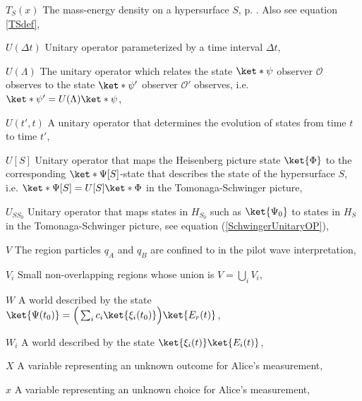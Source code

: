 \begin{thenomenclature}
      \item [{$T_S(x)$  }]\begingroup The mass-energy density on a hypersurface $S$, p. \pageref{firstTS}. Also see equation \ref{TSdef}, \nomrefpage {}
      \item [{$U(\Delta t)$}]\begingroup Unitary operator parameterized by a time interval $\Delta t$, \nomrefpage{}
      \item [{$U(\Lambda)$}]\begingroup The unitary operator which relates the state $\ket*{\psi}$ observer $\mathcal{O}$ observes to the state $\ket*{\psi'}$ observer $\mathcal{O}'$ observes, i.e. $\ket*{\psi'}=U(\Lambda)\ket*{\psi}$, \nomrefpage{}
      \item [{$U(t',t)$}]\begingroup A unitary operator that determines the evolution of states from time $t$ to time $t'$,  \nomrefpage{}
      \item [{$U[S]$}]\begingroup Unitary operator that maps the Heisenberg picture state $\ket{\Phi}$ to the corresponding $\ket*{\Psi[S]}$-state that describes the state of the hypersurface $S$, i.e. $\ket*{\Psi[S]}=U[S]\ket*{\Phi}$ in the Tomonaga-Schwinger picture, \nomrefpage{}
      \item [{$U_{SS_0}$}]\begingroup Unitary operator that maps states in $H_{S_0}$ such as $\ket{\Psi_0}$ to states in $H_S$ in the Tomonaga-Schwinger picture, see equation (\ref{SchwingerUnitaryOP}), \nomrefpage{}
      \item [{$V$}]\begingroup The region particles $q_A$ and $q_B$ are confined to in the pilot wave interpretation, \nomrefpage{}
      \item [{$V_i$}]\begingroup Small non-overlapping regions whose union is $V=\bigcup_iV_i$, \nomrefpage{}
      \item [{$W$}]\begingroup A world described by the state $\ket{\Psi(t_0)}=\Big(\sum_i c_i \ket{\xi_i(t_0)}\Big)\ket{E_r(t)}$,  \nomrefpage{}
      \item [{$W_i$}]\begingroup A world described by the state $\ket{\xi_i(t)}\ket{E_i(t)}$,  \nomrefpage{}
      \item [{$X$}]\begingroup A variable representing an unknown outcome for Alice's measurement, \nomrefpage{}
      \item [{$x$}]\begingroup A variable representing an unknown choice for Alice's measurement, \nomrefpage{}

\end{thenomenclature}
